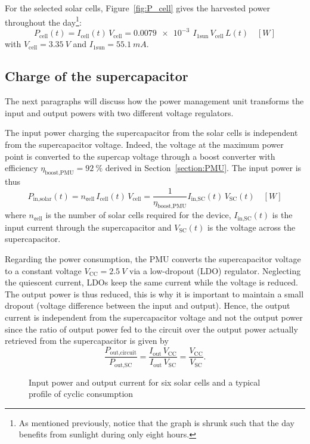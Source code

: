 \documentclass{EPL-master-thesis-covers-EN}
\newcommand{\te}[1]{\textrm{#1}}
\begin{document}
For the selected solar cells, Figure~\ref{fig:P_cell} gives the harvested power throughout the day\footnote{As mentioned previously, notice that the graph is shrunk such that the day benefits from sunlight during only eight hours.}: 
\[
 P_\te{cell}(t) = I_\te{cell}(t)\,V_\te{cell} = \SI{0.0079e-3}{}\,I_{1\te{sun}}\,V_\te{cell}\,L(t) \quad \si{[W]}
\]
with $V_\te{cell} = \SI{3.35}{V}$ and $I_{1\te{sun}} = \SI{55.1}{mA}$.

\subsection*{Charge of the supercapacitor}

The next paragraphs will discuss how the power management unit transforms the input and output powers with two different voltage regulators.

The input power charging the supercapacitor from the solar cells is independent from the supercapacitor voltage. Indeed, the voltage at the maximum power point is converted to the supercap voltage through a boost converter with efficiency $\eta_\te{boost,PMU}=\SI{92}{\%}$ derived in Section~\ref{section:PMU}. The input power is thus
\[
 P_\te{in,solar}(t) = n_\te{¢ell} \, I_\te{cell}(t)\,V_\te{cell} = \frac{1}{\eta_\te{boost,PMU}} I_\te{in,SC}(t) \, V_\te{SC}(t) \quad [\si{W}]
\]
where $n_\te{¢ell}$ is the number of solar cells required for the device, $I_\te{in,SC}(t)$ is the input current through the supercapacitor and $V_\te{SC}(t)$ is the voltage across the supercapacitor.

Regarding the power consumption, the PMU converts the supercapacitor voltage to a constant voltage $V_\te{CC}= \SI{2.5}{V}$ via a low-dropout (LDO) regulator. Neglecting the quiescent current, LDOs keep the same current while the voltage is reduced. The output power is thus reduced, this is why it is important to maintain a small dropout (voltage difference between the input and output). Hence, the output current is independent from the supercapacitor voltage and not the output power since the ratio of output power fed to the circuit over the output power actually retrieved from the supercapacitor is given by
\[
 \frac{P_\te{out,circuit}}{P_\te{out,SC}} = \frac{I_\te{out} \, V_\te{CC}}{I_\te{out} \, V_\te{SC}} = \frac{V_\te{CC}}{V_\te{SC}}.
\]

\begin{figure}[H]
    \centering
    
    \caption{Input power and output current for six solar cells and a typical profile of cyclic consumption}
    \label{fig:P_in_I_out}
\end{figure}
\end{document}
